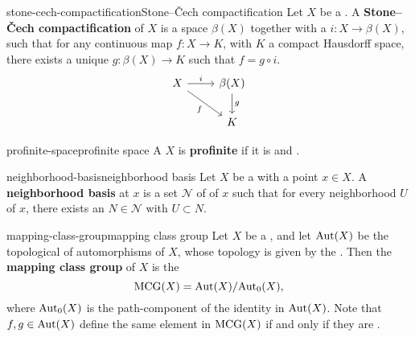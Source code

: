 \begin{topic}{stone-cech-compactification}{Stone--Čech compactification}
    Let $X$ be a . A \textbf{Stone--Čech compactification} of $X$ is a   space $\beta(X)$ together with a  $i : X \to \beta(X)$, such that for any continuous map $f : X \to K$, with $K$ a compact Hausdorff space, there exists a unique $g : \beta(X) \to K$ such that $f = g \circ i$.
    \[ \begin{tikzcd} X \arrow{r}{i} \arrow[swap]{dr}{f} & \beta(X) \arrow{d}{g} \\ & K \end{tikzcd} \]
\end{topic}

\begin{topic}{profinite-space}{profinite space}
    A  $X$ is \textbf{profinite} if it is   and .
\end{topic}

\begin{topic}{neighborhood-basis}{neighborhood basis}
    Let $X$ be a  with a point $x \in X$. A \textbf{neighborhood basis} at $x$ is a set $\mathcal{N}$ of  of $x$ such that for every neighborhood $U$ of $x$, there exists an $N \in \mathcal{N}$ with $U \subset N$.
\end{topic}

\begin{topic}{mapping-class-group}{mapping class group}
    Let $X$ be a , and let $\textup{Aut}(X)$ be the topological  of automorphisms of $X$, whose topology is given by the . Then the \textbf{mapping class group} of $X$ is the 
    \[ \textup{MCG}(X) = \textup{Aut}(X) / \textup{Aut}_0(X) , \]
    where $\textup{Aut}_0(X)$ is the path-component of the identity in $\textup{Aut}(X)$. Note that $f, g \in \textup{Aut}(X)$ define the same element in $\textup{MCG}(X)$ if and only if they are .
\end{topic}

